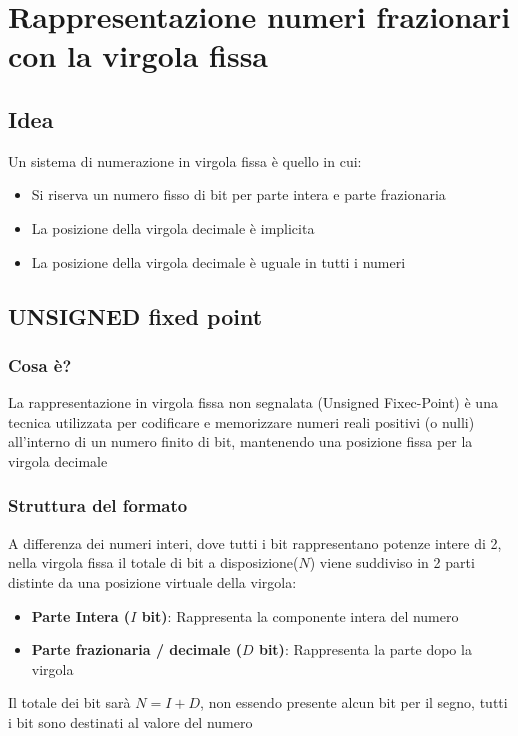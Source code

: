 \chapter{Rappresentazione numeri frazionari con la virgola fissa}
\section{Idea}
Un sistema di numerazione in virgola fissa è quello in cui:
\begin{itemize}
    \item Si riserva un numero fisso di bit per parte intera e parte frazionaria
    \item La posizione della virgola decimale è implicita
    \item La posizione della virgola decimale è uguale in tutti i numeri
\end{itemize}

\section{UNSIGNED fixed point}
\subsection{Cosa è?}
La rappresentazione in virgola fissa non segnalata (Unsigned Fixec-Point) è una tecnica utilizzata per codificare e memorizzare numeri reali positivi (o nulli) all'interno di un numero finito di bit, mantenendo una posizione fissa per la virgola decimale

\subsection{Struttura del formato}
A differenza dei numeri interi, dove tutti i bit rappresentano potenze intere di 2, nella virgola fissa il totale di bit a disposizione($N$) viene suddiviso in 2 parti distinte da una posizione virtuale della virgola:
\begin{itemize}
    \item \textbf{Parte Intera ($I$ bit)}: Rappresenta la componente intera del numero
    \item \textbf{Parte frazionaria / decimale ($D$ bit)}: Rappresenta la parte dopo la virgola
\end{itemize}

Il totale dei bit sarà $N=I+D$, non essendo presente alcun bit per il segno, tutti i bit sono destinati al valore del numero

